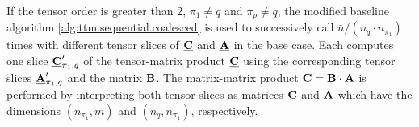 If the tensor order is greater than $2$, $\pi_1\neq q$ and $\pi_p \neq q$, the modified baseline algorithm \ref{alg:ttm.sequential.coalesced} is used to successively call $\bar{n} / (n_q \cdot n_{\pi_1})$ times  with different tensor slices of $\underline{\mathbf{C}}$ and $\underline{\mathbf{A}}$ in the base case.
Each  computes one slice $\underline{\mathbf{C}}_{\pi_1,q}'$ of the tensor-matrix product $\underline{\mathbf{C}}$ using the corresponding tensor slices $\underline{\mathbf{A}}_{\pi_1,q}'$ and the matrix $\mathbf{B}$.
The matrix-matrix product $\mathbf{C} = \mathbf{B} \cdot \mathbf{A}$ is performed by interpreting both tensor slices as matrices $\mathbf{C}$ and $\mathbf{A}$ which have the dimensions $(n_{\pi_1},m)$ and $(n_q,n_{\pi_1})$, respectively.


\begin{comment}

Lines 8 to 10 of Algorithm \ref{alg:ttv.sequential.blocked} perform a slice-vector multiplication of the form $\mbc' = \mbA' \cdot \mbb$.
It is executed with a \tf{GEMV} with no further adjustment of the algorithm.
The vector $\mbc'$ denotes a fiber of $\mubC$ with $n_u$ elements and $\mbA'$ denotes an order-$2$ slice of $\mubA$ with dimensions $n_u$ and $n_v$ such that
\begin{equation}
\label{equ:order.2.slice}
\mbA' = \mubA(i_1,\dots,\colon_{\mkern-5.5muu},\dots,\colon_{\mkern-5.5muv},\dots,i_p) 
\quad \text{and} \quad
\mbc' = \mubC(i_1,\dots,\colon_{\mkern-5.5muu},\dots,i_p)
\end{equation}
where $u=\pi_1$ and $v = q$ or vice versa.
Algorithm \ref{alg:ttv.sequential.blocked} needs a minor modification in order to loop over order-$\mhq$ slices. 
With $\mhq = (\pi^{-1})_q$, the conditions in line 2 and 4 are changed to $1 < r \leq \mhq$ and $\mhq < r$, respectively.
The modified algorithms therefore omits the first $\mhq$ modes $\pi_1, \dots, \pi_{\mhq}$ including $\pi_{\mhq} = q$ where all elements of an order-$\mhq$ slice are contiguously stored.
Choosing the first-order storage format for convenience, the order-$\mhq$ and order-$(\mhq-1)$ slices of both tensors are given by 
\begin{equation}
\label{equ:order.mhq.slice}
\mubA' = \mubA(\colon_{\mkern-5.5mu1},\dots,\colon_{\mkern-5.5muq},i_{q+1},\dots,i_{p}) 
\ \text{and} \
\mubC' = \mubC(\colon_{\mkern-5.5mu1},\dots,\colon_{\mkern-5.5mu{q-1}},i_{q+1},\dots,i_p).
\end{equation}
The fiber $\mbc'$ of length $w_q = n_{1} \cdot n_2 \cdots n_{q-1}$ is the one-dimensional interpretation of $\mubC'$ and the order-$2$ slice $\mbA'$ with dimensions $w_q$ and $n_q$ the two-dimensional interpretation of $\mubA'$.
The slice-vector multiplication in this case can be performed with a \tf{GEMV} that interprets the order-$\mhq$ slices as order-$2$ according to the description.
\end{comment}


